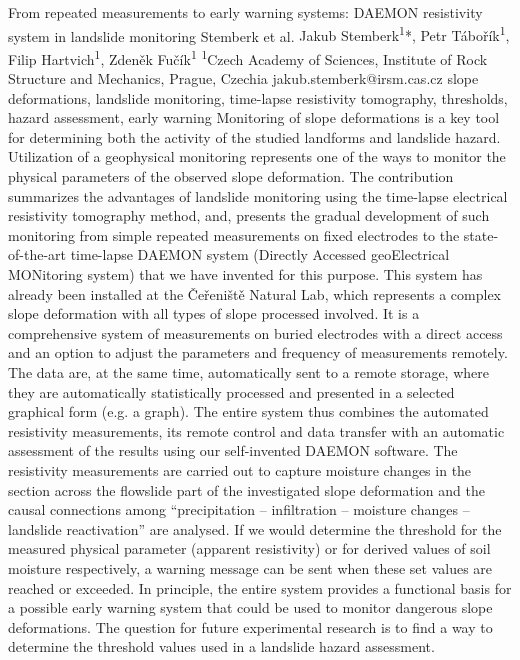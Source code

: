 \abstract
{From repeated measurements to early warning systems: DAEMON resistivity system in landslide monitoring} 
{Stemberk et al.} 
{Jakub Stemberk\textsuperscript{1}*, Petr Tábořík\textsuperscript{1}, Filip Hartvich\textsuperscript{1}, Zdeněk Fučík\textsuperscript{1}} 
{\POtag} 
{
\textsuperscript{1}Czech Academy of Sciences, Institute of Rock Structure and Mechanics, Prague, Czechia
}
{jakub.stemberk@irsm.cas.cz}  %
{slope deformations, landslide monitoring, time-lapse resistivity tomography, thresholds, hazard assessment, early warning}
{Monitoring of slope deformations is a key tool for determining both the activity of the studied landforms and landslide hazard. Utilization of a geophysical monitoring represents one of the ways to monitor the physical parameters of the observed slope deformation. The contribution summarizes the advantages of landslide monitoring using the time-lapse electrical resistivity tomography method, and, presents the gradual development of such monitoring from simple repeated measurements on fixed electrodes to the state-of-the-art time-lapse DAEMON system (Directly Accessed geoElectrical MONitoring system) that we have invented for this purpose. This system has already been installed at the Čeřeniště Natural Lab, which represents a complex slope deformation with all types of slope processed involved. It is a comprehensive system of measurements on buried electrodes with a direct access and an option to adjust the parameters and frequency of measurements remotely. The data are, at the same time, automatically sent to a remote storage, where they are automatically statistically processed and presented in a selected graphical form (e.g. a graph). The entire system thus combines the automated resistivity measurements, its remote control and data transfer with an automatic assessment of the results using our self-invented DAEMON software. The resistivity measurements are carried out to capture moisture changes in the section across the flowslide part of the investigated slope deformation and the causal connections among \enquote{precipitation – infiltration – moisture changes – landslide reactivation} are analysed. If we would determine the threshold for the measured physical parameter (apparent resistivity) or for derived values of soil moisture respectively, a warning message can be sent when these set values are reached or exceeded. In principle, the entire system provides a functional basis for a possible early warning system that could be used to monitor dangerous slope deformations. The question for future experimental research is to find a way to determine the threshold values used in a landslide hazard assessment.
}

